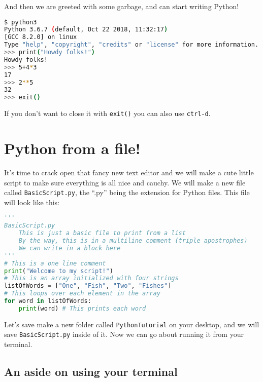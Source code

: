 \documentclass[11pt, twoside, reqno]{book}
\begin{document}
And then we are greeted with some garbage, and can start writing Python!
\begin{lstlisting}[language=sh]
$ python3
Python 3.6.7 (default, Oct 22 2018, 11:32:17) 
[GCC 8.2.0] on linux
Type "help", "copyright", "credits" or "license" for more information.
>>> print("Howdy folks!")
Howdy folks!
>>> 5+4*3
17
>>> 2**5
32
>>> exit()
\end{lstlisting}

If you don't want to close it with \texttt{exit()} you can also use \texttt{ctrl-d}.

\section{Python from a file!}

It's time to crack open that fancy new text editor and we will make a cute little script to make sure everything is all nice and cauchy. We will make a new file called \texttt{BasicScript.py}, the ``.py'' being the extension for Python files. This file will look like this:
\begin{lstlisting}[language=Python]
'''
BasicScript.py
    This is just a basic file to print from a list
    By the way, this is in a multiline comment (triple apostrophes)
    We can write in a block here
'''
# This is a one line comment
print("Welcome to my script!")
# This is an array initialized with four strings
listOfWords = ["One", "Fish", "Two", "Fishes"]
# This loops over each element in the array
for word in listOfWords:
    print(word) # This prints each word
\end{lstlisting}

Let's save make a new folder called \texttt{PythonTutorial} on your desktop, and we will save \texttt{BasicScript.py} inside of it. Now we can go about running it from your terminal.

\subsection{An aside on using your terminal}
\end{document}
